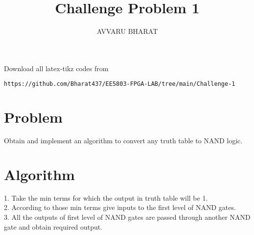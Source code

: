 \documentclass{article}
\begin{document}
     \def\rightbox#1{\makebox[0in][r]{#1}}
     \def\centbox#1{\makebox[0in]{#1}}
     \def\topbox#1{\raisebox{-\baselineskip}[0in][0in]{#1}}
     \def\midbox#1{\raisebox{-0.5\baselineskip}[0in][0in]{#1}}
\vspace{3cm}
\title{Challenge Problem 1}
\author{AVVARU BHARAT}
\date{}
\maketitle
\renewcommand\thefigure{\arabic{figure}}
\setcounter{figure}{0}
\renewcommand{\thetable}{\arabic{table}}
\setcounter{table}{0}
Download all latex-tikz codes from 
%
\begin{lstlisting}
https://github.com/Bharat437/EE5803-FPGA-LAB/tree/main/Challenge-1
\end{lstlisting}
%
\section{Problem}
Obtain and implement an algorithm to convert any truth table to NAND logic.
\section{Algorithm}
1. Take the min terms for which the output in truth table will be 1.\\
2. According to those min terms give inputs to the first level of NAND gates.\\
3. All the outputs of first level of NAND gates are passed through another NAND gate and obtain required output.
\end{document}
